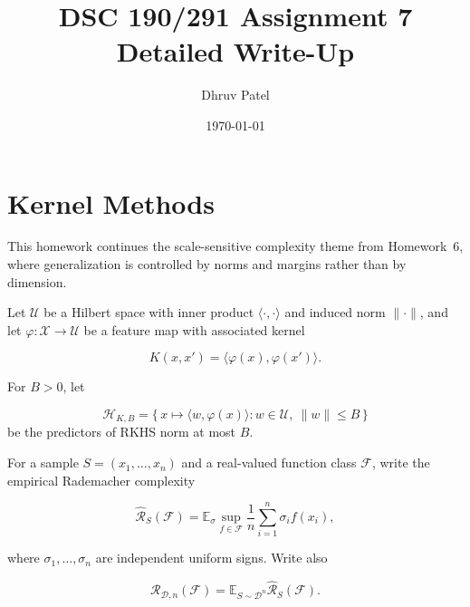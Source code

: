 \documentclass[11pt]{article}
\title{\textbf{DSC 190/291 Assignment 7}\\Detailed Write-Up}
\author{Dhruv Patel}
\date{\today}
\begin{document}
\maketitle
\tableofcontents
\newpage

\section{Kernel Methods}
This homework continues the scale-sensitive complexity theme from Homework~6, 
where generalization is controlled by norms and margins rather than by dimension.

Let $\mathcal{U}$ be a Hilbert space with inner product $\langle \cdot,\cdot \rangle$ 
and induced norm $\|\cdot\|$, and let $\varphi : \mathcal{X} \to \mathcal{U}$ be 
a feature map with associated kernel 

\[
K(x,x') = \langle \varphi(x), \varphi(x') \rangle.
\]

For $B > 0$, let 

\[
\mathcal{H}_{K,B} 
= 
\{\, x \mapsto \langle w, \varphi(x) \rangle : w \in \mathcal{U},\ \|w\| \le B \,\}
\]
be the predictors of RKHS norm at most $B$.

For a sample $S = (x_1,\ldots,x_n)$ and a real-valued function class $\mathcal{F}$, 
write the empirical Rademacher complexity


\[
\widehat{\mathcal{R}}_{S}(\mathcal{F})
=
\mathbb{E}_{\sigma}
\sup_{f \in \mathcal{F}}
\frac{1}{n}
\sum_{i=1}^n \sigma_i f(x_i),
\]


where $\sigma_1,\ldots,\sigma_n$ are independent uniform signs.  
Write also


\[
\mathcal{R}_{\mathcal{D},n}(\mathcal{F})
=
\mathbb{E}_{S \sim \mathcal{D}^n}
\widehat{\mathcal{R}}_{S}(\mathcal{F}).
\]
\end{document}
